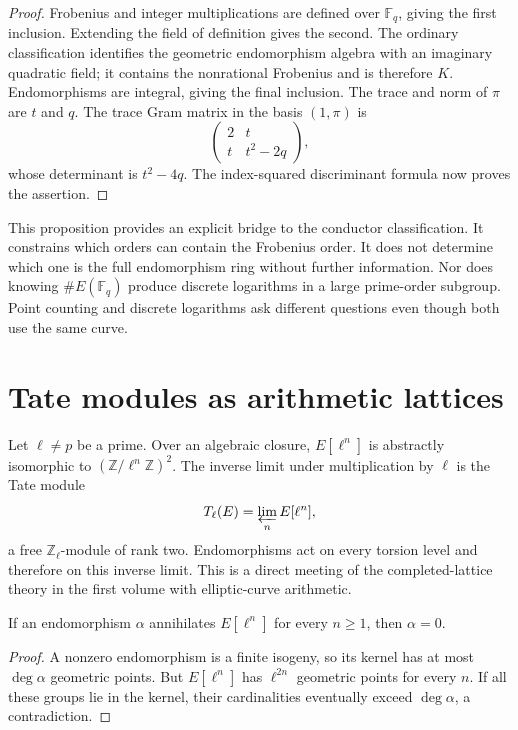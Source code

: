 \begin{proof}
Frobenius and integer multiplications are defined over
$\mathbb F_q$, giving the first inclusion. Extending the field
of definition gives the second. The ordinary classification
identifies the geometric endomorphism algebra with an imaginary
quadratic field; it contains the nonrational Frobenius and is
therefore $K$. Endomorphisms are integral, giving the final
inclusion. The trace and norm of $\pi$ are $t$ and $q$.
The trace Gram matrix in the basis $(1,\pi)$ is
\[
 \begin{pmatrix}2&t\\t&t^2-2q\end{pmatrix},
\]
whose determinant is $t^2-4q$. The index-squared discriminant
formula now proves the assertion.
\end{proof}

This proposition provides an explicit bridge to the conductor
classification. It constrains which orders can contain the
Frobenius order. It does not determine which one is the full
endomorphism ring without further information. Nor does knowing
$\#E(\mathbb F_q)$ produce discrete logarithms in a large
prime-order subgroup. Point counting and discrete logarithms
ask different questions even though both use the same curve.

\section{Tate modules as arithmetic lattices}

Let $\ell\ne p$ be a prime. Over an algebraic closure,
$E[\ell^n]$ is abstractly isomorphic to
$(\mathbb Z/\ell^n\mathbb Z)^2$. The inverse limit under
multiplication by $\ell$ is the Tate module
\[
 T_\ell(E)=\varprojlim_n E[\ell^n],
\]
a free $\mathbb Z_\ell$-module of rank two. Endomorphisms act
on every torsion level and therefore on this inverse limit.
This is a direct meeting of the completed-lattice
theory in the first volume with elliptic-curve arithmetic.

\begin{lemma}
If an endomorphism $\alpha$ annihilates $E[\ell^n]$ for every
$n\ge1$, then $\alpha=0$.
\end{lemma}

\begin{proof}
A nonzero endomorphism is a finite isogeny, so its kernel has at
most $\deg\alpha$ geometric points. But $E[\ell^n]$ has
$\ell^{2n}$ geometric points for every $n$. If all these groups
lie in the kernel, their cardinalities eventually exceed
$\deg\alpha$, a contradiction.
\end{proof}

